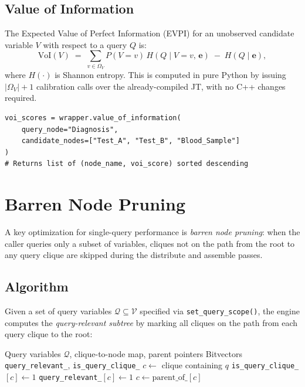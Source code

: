 \documentclass[11pt, letterpaper]{article}
\theoremstyle{definitionstyle}
\begin{document}
\subsection{Value of Information}

The Expected Value of Perfect Information (EVPI) for an unobserved
candidate variable $V$ with respect to a query $Q$ is:
\[
  \mathrm{VoI}(V) \;=\;
  \sum_{v\in\Omega_V} P(V=v)\,H\!\left(Q \mid V=v,\,\mathbf{e}\right)
  \;-\; H(Q \mid \mathbf{e}),
\]
where $H(\cdot)$ is Shannon entropy. This is computed in pure Python by
issuing $|\Omega_V|+1$ calibration calls over the already-compiled JT,
with no C++ changes required.

\begin{lstlisting}[style=pythonstyle, caption={Value of Information API}]
voi_scores = wrapper.value_of_information(
    query_node="Diagnosis",
    candidate_nodes=["Test_A", "Test_B", "Blood_Sample"]
)
# Returns list of (node_name, voi_score) sorted descending
\end{lstlisting}


\section{Barren Node Pruning}
\label{sec:pruning}

A key optimization for single-query performance is \emph{barren node pruning}:
when the caller queries only a subset of variables, cliques not on the path
from the root to any query clique are skipped during the distribute and
assemble passes.

\subsection{Algorithm}

Given a set of query variables $\mathcal{Q} \subseteq \mathcal{V}$ specified
via \texttt{set\_query\_scope()}, the engine computes the \emph{query-relevant
subtree} by marking all cliques on the path from each query clique to the
root:

\begin{algorithm}[ht]
\caption{Barren Node Pruning --- Query-Relevant Subtree}
\label{alg:pruning}
\begin{algorithmic}[1]
\Require Query variables $\mathcal{Q}$, clique-to-node map, parent pointers
\Ensure Bitvectors \texttt{query\_relevant\_}, \texttt{is\_query\_clique\_}
  \State $c \leftarrow$ clique containing $q$
  \State \texttt{is\_query\_clique\_}$[c] \leftarrow 1$
    \State \texttt{query\_relevant\_}$[c] \leftarrow 1$
    \State $c \leftarrow \text{parent\_of\_}[c]$
  \EndWhile
\EndFor
\end{algorithmic}
\end{algorithm}
\end{document}
